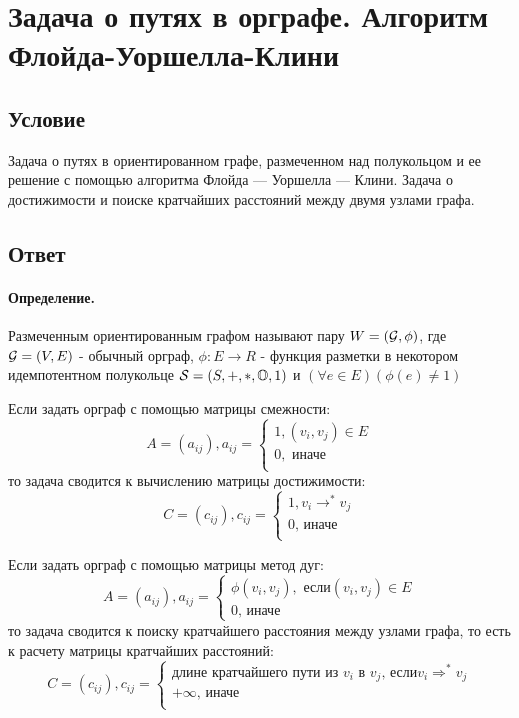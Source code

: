 \documentclass{report}
\newcommand{\pathto}[1][1]{ \Rightarrow^{*}_{#1} }
\begin{document}
\newpage

\section{Задача о путях в орграфе. Алгоритм Флойда-Уоршелла-Клини}
\subsection{Условие}
Задача о путях в ориентированном графе, размеченном над полукольцом и ее решение
с помощью алгоритма Флойда — Уоршелла — Клини. Задача о достижимости и поиске
кратчайших расстояний между двумя узлами графа.

\subsection{Ответ}

\paragraph*{Определение.}
Размеченным ориентированным графом называют пару $W = ( {\cal G}, \phi )$, где
$ {\cal G} = (V, E)$ - обычный орграф, $\phi: E \to R$ - функция разметки в некотором идемпотентном
полукольце $ {\cal S} = (S, +, *, \mathbb{O}, 1)$ и $(\forall e \in E)(\phi(e) \neq 1)$

\medskip

Если задать орграф с помощью матрицы смежности:
 \[
A = (a_{ij}), a_{ij} = 
\begin{cases}
	1, (v_i,v_j) \in E \\
	0,\mbox{ иначе }\\
\end{cases}
\] 
то задача сводится к вычислению матрицы достижимости:
\[
C = (c_{ij}), c_{ij} = 
\begin{cases}
	1, v_{i} \to ^{*} v_{j} \\
	0\mbox{, иначе} \\
\end{cases}
\] 

\medskip

Если задать орграф с помощью матрицы метод дуг:
\[
A = (a_{ij}), a_{ij} =
\begin{cases}
	\phi(v_{i},v_{j}),\mbox{ если} (v_{i}, v_{j}) \in E \\
	0\mbox{, иначе}
\end{cases}
\] 
то задача сводится к поиску кратчайшего расстояния между узлами графа, то есть к расчету
матрицы кратчайших расстояний:
\[
C = (c_{ij}), c_{ij} =
\begin{cases}
	\mbox{длине кратчайшего пути из $v_{i}$ в $v_{j}$, если} v_{i} \pathto[] v_{j}\\
	+\infty\mbox{, иначе} \\
\end{cases}
\] 
\end{document}
